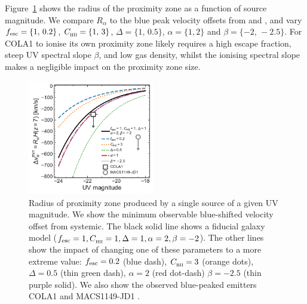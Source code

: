 \documentclass[fleqn,usenatbib]{mnras}
\begin{document}
Figure~\ref{fig:R_opticallythin} shows the radius of the proximity zone as a function of source magnitude. We compare $R_\alpha$ to the blue peak velocity offsets from \citet{Matthee2018b} and \citet{Hashimoto2018a}, and vary $\fesc =\{1,\,0.2\}$, $\clump =\{1,\,3\}$, $\Delta =\{1,\,0.5\}$, $\alpha =\{1,2\}$ and $\beta = \{-2,\,-2.5\}$. For COLA1 to ionise its own proximity zone likely requires a high escape fraction, steep UV spectral slope $\beta$, and low gas density, whilst the ionising spectral slope makes a negligible impact on the proximity zone size.

\begin{figure}
    \includegraphics[width=0.49\textwidth]{figs/fig6.pdf}
    \caption{Radius of proximity zone produced by a single source of a given UV magnitude. We show the minimum observable blue-shifted velocity offset from systemic. The black solid line shows a fiducial galaxy model ($\fesc=1, \clump=1, \Delta=1, \alpha=2, \beta=-2$). The other lines show the impact of changing one of these parameters to a more extreme value: $\fesc=0.2$ (blue dash), $\clump=3$ (orange dots), $\Delta=0.5$ (thin green dash), $\alpha=2$ (red dot-dash) $\beta=-2.5$ (thin purple solid). We also show the observed blue-peaked \lya emitters COLA1 \citep{Hu2016,Matthee2018b} and MACS1149-JD1 \citep{Hashimoto2018a}.}
    \label{fig:R_opticallythin}
\end{figure}
\end{document}

